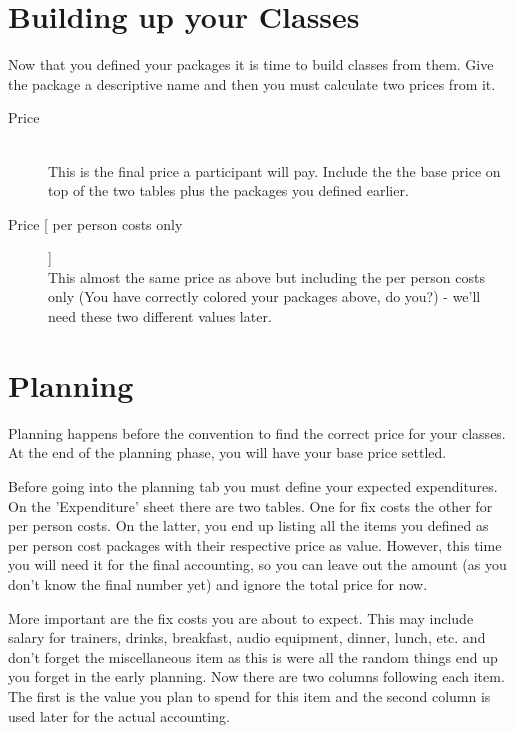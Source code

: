 \documentclass[11pt]{report}
\begin{document}
\section{Building up your Classes}

Now that you defined your packages it is time to build classes from them. Give 
the package a descriptive name and then you must calculate two prices from it.

\begin{description}
	\item [Price] \hfill \\
	This is the final price a participant will pay. Include the the base price on 
	top of the two tables plus the packages you defined earlier.
	
	\item [Price [ per person costs only] ] \hfill \\
	This almost the same price as above but including the per person 
	costs only (You have correctly colored your packages above, do you?) - we'll
	need these two different values later.
\end{description}

\section{Planning}

Planning happens before the convention to find the correct price for your 
classes. At the end of the planning phase, you will have your base price 
settled.

Before going into the planning tab you must define your expected expenditures. 
On the 'Expenditure' sheet there are two tables. One for fix costs the other for 
per person costs. On the latter, you end up listing all the items you defined as 
per person cost packages with their respective price as value. However, this time 
you will need it for the final accounting, so you can leave out the amount (as 
you don't know the final number yet) and ignore the total price for now.

More important are the fix costs you are about to expect. This may include 
salary for trainers, drinks, breakfast, audio equipment, dinner, lunch, etc. and 
don't forget the miscellaneous item as this is were all the random things end up 
you forget in the early planning. Now there are two columns following each item. 
The first is the value you plan to spend for this item and the second column is 
used later for the actual accounting. 
\end{document}
